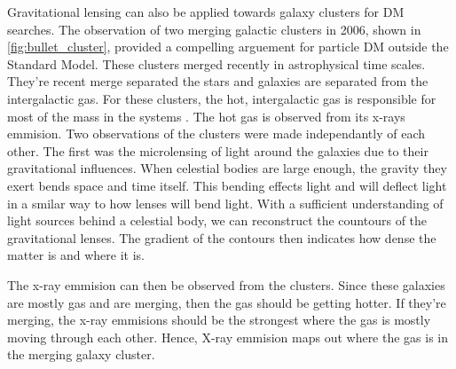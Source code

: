 \begin{figure}[ht]
\end{figure}

Gravitational lensing can also be applied towards galaxy clusters for DM searches.
The observation of two merging galactic clusters in 2006, shown in \cref{fig:bullet_cluster}, provided a compelling arguement for particle DM outside the Standard Model.
These clusters merged recently in astrophysical time scales.
They're recent merge separated the stars and galaxies are separated from the intergalactic gas.
For these clusters, the hot, intergalactic gas is responsible for most of the mass in the systems \cite{Hooper:DMHistory}.
The hot gas is observed from its x-rays emmision.
Two observations of the clusters were made independantly of each other.
The first was the microlensing of light around the galaxies due to their gravitational influences.
When celestial bodies are large enough, the gravity they exert bends space and time itself.
This bending effects light and will deflect light in a smilar way to how lenses will bend light.
With a sufficient understanding of light sources behind a celestial body, we can reconstruct the countours of the gravitational lenses.
The gradient of the contours then indicates how dense the matter is and where it is.

The x-ray emmision can then be observed from the clusters.
Since these galaxies are mostly gas and are merging, then the gas should be getting hotter.
If they're merging, the x-ray emmisions should be the strongest where the gas is mostly moving through each other.
Hence, X-ray emmision maps out where the gas is in the merging galaxy cluster.

